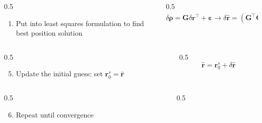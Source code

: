 \begin{frame}[label=gnss_ls_bk]
\begin{columns}
\begin{column}{0.5\textwidth}
{\begin{enumerate}
                \item Put into \alert{least squares formulation} to find best position solution
            \end{enumerate}}
        \end{column}
        \begin{column}{0.5\textwidth}
            \scriptsize \begin{equation*}
                \delta\boldsymbol{\rho} = \mathbf{G}  \delta \mathbf{r}^{\top} + \boldsymbol{\varepsilon} \xrightarrow[]{}  \delta \hat{\mathbf{r}} = \left( \mathbf{G}^{\top} \mathbf{G} \right)^{-1} \mathbf{G}^{\top} \delta \boldsymbol{\rho}
            \end{equation*}
        \end{column}
    \end{columns}
    \begin{columns}
        \begin{column}{0.5\textwidth}
            {\setlength{\leftmargini}{1em} \begin{enumerate}   \setcounter{enumi}{4}
                \item \alert{Update the initial guess}: set \(\mathbf{r}_0^s = \hat{\mathbf{r}}\)
            \end{enumerate}}
        \end{column}
        \begin{column}{0.5\textwidth}
            \scriptsize \begin{equation*}
                \hat{\mathbf{r}} = \mathbf{r}_0^s + \delta \hat{\mathbf{r}}
            \end{equation*}
        \end{column}
    \end{columns}
    \begin{columns}
        \begin{column}{0.5\textwidth}
            {\setlength{\leftmargini}{1em} \begin{enumerate} \setcounter{enumi}{5}
                \item \alert{Repeat} until convergence
            \end{enumerate}}
        \end{column}
        \begin{column}{0.5\textwidth}
            
        \end{column}
    \end{columns}
\end{frame}

